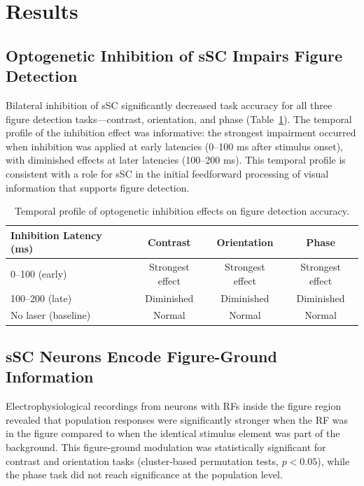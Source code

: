 \documentclass[12pt]{article}
\begin{document}
\section{Results}

\subsection{Optogenetic Inhibition of sSC Impairs Figure Detection}

Bilateral inhibition of sSC significantly decreased task accuracy for all three figure detection tasks---contrast, orientation, and phase (Table~\ref{tab:opto}). The temporal profile of the inhibition effect was informative: the strongest impairment occurred when inhibition was applied at early latencies (0--100 ms after stimulus onset), with diminished effects at later latencies (100--200 ms). This temporal profile is consistent with a role for sSC in the initial feedforward processing of visual information that supports figure detection.

\begin{table}[htbp]
\centering
\caption{Temporal profile of optogenetic inhibition effects on figure detection accuracy.}
\label{tab:opto}
\begin{tabular}{lccc}
\toprule
Inhibition Latency (ms) & Contrast & Orientation & Phase \\
\midrule
0--100 (early) & Strongest effect & Strongest effect & Strongest effect \\
100--200 (late) & Diminished & Diminished & Diminished \\
No laser (baseline) & Normal & Normal & Normal \\
\bottomrule
\end{tabular}
\end{table}

\subsection{sSC Neurons Encode Figure-Ground Information}

Electrophysiological recordings from neurons with RFs inside the figure region revealed that population responses were significantly stronger when the RF was in the figure compared to when the identical stimulus element was part of the background. This figure-ground modulation was statistically significant for contrast and orientation tasks (cluster-based permutation tests, $p < 0.05$), while the phase task did not reach significance at the population level.
\end{document}
